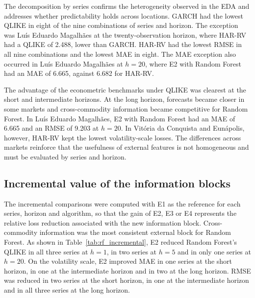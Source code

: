 \documentclass[a4paper,fleqn]{cas-sc}
\begin{document}
The decomposition by series confirms the heterogeneity observed in the EDA and addresses whether predictability holds across locations. GARCH had the lowest QLIKE in eight of the nine combinations of series and horizon. The exception was Luís Eduardo Magalhães at the twenty-observation horizon, where HAR-RV had a QLIKE of 2.488, lower than GARCH. HAR-RV had the lowest RMSE in all nine combinations and the lowest MAE in eight. The MAE exception also occurred in Luís Eduardo Magalhães at \(h=20\), where E2 with Random Forest had an MAE of 6.665, against 6.682 for HAR-RV.

The advantage of the econometric benchmarks under QLIKE was clearest at the short and intermediate horizons. At the long horizon, forecasts became closer in some markets and cross-commodity information became competitive for Random Forest. In Luís Eduardo Magalhães, E2 with Random Forest had an MAE of 6.665 and an RMSE of 9.203 at \(h=20\). In Vitória da Conquista and Eunápolis, however, HAR-RV kept the lowest volatility-scale losses. The differences across markets reinforce that the usefulness of external features is not homogeneous and must be evaluated by series and horizon.

\subsection{Incremental value of the information blocks}
\label{subsec:results_incremental}

The incremental comparisons were computed with E1 as the reference for each series, horizon and algorithm, so that the gain of E2, E3 or E4 represents the relative loss reduction associated with the new information block. Cross-commodity information was the most consistent external block for Random Forest. As shown in Table~\ref{tab:rf_incremental}, E2 reduced Random Forest's QLIKE in all three series at \(h=1\), in two series at \(h=5\) and in only one series at \(h=20\). On the volatility scale, E2 improved MAE in one series at the short horizon, in one at the intermediate horizon and in two at the long horizon. RMSE was reduced in two series at the short horizon, in one at the intermediate horizon and in all three series at the long horizon.
\end{document}
